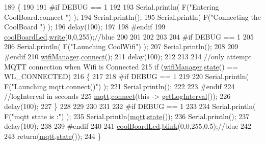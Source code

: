 \begin{DoxyCode}
189 \{
190 
191 \textcolor{preprocessor}{#if DEBUG == 1  }
192 
193     Serial.println( F(\textcolor{stringliteral}{"Entering CoolBoard.connect "}) );
194     Serial.println();
195     Serial.println( F(\textcolor{stringliteral}{"Connecting the CoolBoard  "}) );
196     delay(100);
197 
198 \textcolor{preprocessor}{#endif}
199     \hyperlink{classCoolBoard_a1b1d3c684a5baa56b08486e192fd8e97}{coolBoardLed}.\hyperlink{classCoolBoardLed_a30fadd4cbec17ceea428bf7a32207e87}{write}(0,0,255);\textcolor{comment}{//blue}
200 
201     
202             
203     
204 \textcolor{preprocessor}{#if DEBUG == 1      }
205 
206     Serial.println( F(\textcolor{stringliteral}{"Launching CoolWifi"}) );
207     Serial.println();
208 
209 \textcolor{preprocessor}{#endif}
210     \hyperlink{classCoolBoard_acd88e6003606b47479ebba81e4aceeca}{wifiManager}.\hyperlink{classCoolWifi_ad060353050f40d032a2dbf9e54a768bf}{connect}();
211     delay(100);
212 
213 
214     \textcolor{comment}{//only attempt MQTT connection when Wifi is Connected}
215     \textcolor{keywordflow}{if} (\hyperlink{classCoolBoard_acd88e6003606b47479ebba81e4aceeca}{wifiManager}.\hyperlink{classCoolWifi_a1c7b4d82a4098d346e7593dce92039fa}{state}() == WL\_CONNECTED)
216     \{
217 
218 \textcolor{preprocessor}{    #if DEBUG == 1  }
219     
220         Serial.println( F(\textcolor{stringliteral}{"Launching mqtt.connect()"}) );
221         Serial.println();
222     
223 \textcolor{preprocessor}{    #endif  }
224         \textcolor{comment}{//logInterval in seconds}
225         \hyperlink{classCoolBoard_a2399f44d7c23c1149a335cb3b46d90f1}{mqtt}.\hyperlink{classCoolMQTT_a50075d0ab23a327ab897fd6adad20eda}{connect}(\textcolor{keyword}{this} -> \hyperlink{classCoolBoard_a7508e029f2ee17bb747ffab599285e0d}{getLogInterval}());
226         delay(100);
227     \}
228     
229         
230     
231     
232 \textcolor{preprocessor}{#if DEBUG == 1}
233 
234     Serial.println( F(\textcolor{stringliteral}{"mqtt state is :"}) );
235     Serial.println(\hyperlink{classCoolBoard_a2399f44d7c23c1149a335cb3b46d90f1}{mqtt}.\hyperlink{classCoolMQTT_a5d003307eff78efbd585e42b43b72b6d}{state}());
236     Serial.println();
237     delay(100);
238 
239 \textcolor{preprocessor}{#endif}
240 
241     \hyperlink{classCoolBoard_a1b1d3c684a5baa56b08486e192fd8e97}{coolBoardLed}.\hyperlink{classCoolBoardLed_a96e1ea13003eee34c9dbcef340404426}{blink}(0,0,255,0.5);\textcolor{comment}{//blue}
242 
243     \textcolor{keywordflow}{return}(\hyperlink{classCoolBoard_a2399f44d7c23c1149a335cb3b46d90f1}{mqtt}.\hyperlink{classCoolMQTT_a5d003307eff78efbd585e42b43b72b6d}{state}());
244 \}
\end{DoxyCode}
